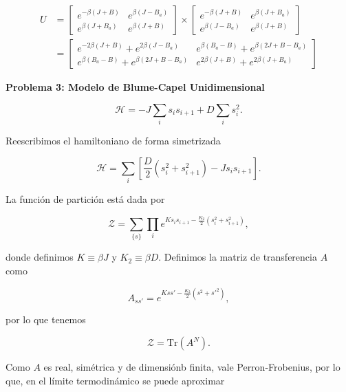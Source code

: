\documentclass[10pt]{article}
\begin{document}
\begin{align}
U &= 
\begin{bmatrix}
e^{-\beta(J+B)} & e^{\beta(J-B_a)}\\
e^{\beta(J+B_a)} & e^{\beta(J+B)}
\end{bmatrix}
\times
\begin{bmatrix}
e^{-\beta(J+B)} & e^{\beta(J+B_a)}\\
e^{\beta(J-B_a)} & e^{\beta(J+B)}
\end{bmatrix} \\
&= 
\begin{bmatrix}
e^{-2\beta(J+B)} + e^{2\beta(J-B_a)} & e^{\beta(B_a-B)} + e^{\beta(2J+B-B_a)}\\
e^{\beta(B_a-B)} + e^{\beta(2J+B-B_a)} & e^{2\beta(J+B)} + e^{2\beta(J+B_a)}
\end{bmatrix}
\end{align}

\pagebreak

\textbf{Problema 3: Modelo de Blume-Capel Unidimensional}

\begin{equation}
\mathcal{H} = -J \sum_i s_i s_{i+1} + D \sum_i s_i^2.
\end{equation}

Reescribimos el hamiltoniano de forma simetrizada

\begin{equation}
\mathcal{H} = \sum_i \left[\dfrac{D}{2} \left(s_i^2+s_{i+1}^2\right) - J s_i s_{i+1}\right].
\end{equation}

La funci\'on de partici\'on est\'a dada por 

\begin{equation}
\mathcal{Z} = \sum_{\lbrace s \rbrace} \prod_i e^{Ks_i s_{i+1} - \frac{K_2}{2}(s_i^2 + s_{i+1}^2)},
\end{equation}

donde definimos $K \equiv \beta J$ y $K_2 \equiv \beta D$. Definimos la matriz de transferencia $A$ como

\begin{equation}
A_{ss'} = e^{Ks s' - \frac{K_2}{2}(s^2 + s'^2)},
\end{equation}

por lo que tenemos 

\begin{equation}
\mathcal{Z} = \text{Tr} (A^N).
\end{equation}

Como $A$ es real, sim\'etrica y de dimensi\'onb finita, vale Perron-Frobenius, por lo que, en el l\'imite termodin\'amico se puede aproximar
\end{document}
